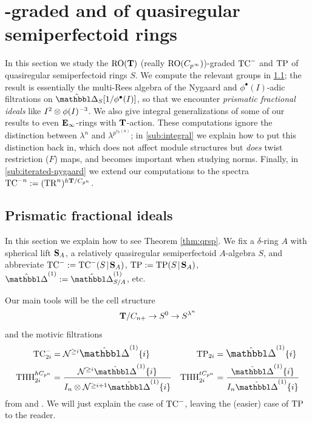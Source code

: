 %
\section{-graded  and  of quasiregular semiperfectoid rings}
\label{sec:qrsp}


\newcommand{\vprism}{\prismcpl^{(1)}}

In this section we study the $\RO(\T)$ (really $\RO(C_{p^\infty})$)-graded $\TCmin$ and $\TP$ of quasiregular semiperfectoid rings $S$. We compute the relevant groups in \sec\ref{sub:qrsp-fractional}; the result is essentially the multi-Rees algebra of the Nygaard and $\phi^\bullet(I)$-adic filtrations on $\prismcpl_S[1/\phi^\bullet(I)]$, so that we encounter \emph{prismatic fractional ideals} like $I^2 \tnsr \phi(I)^{-3}$. We also give integral generalizations of some of our results to even $\E_\infty$-rings with $\T$-action. These computations ignore the distinction between $\lambda^n$ and $\lambda^{p^{v_p(n)}}$; in \sec\ref{sub:integral} we explain how to put this distinction back in, which does not affect module structures but \emph{does} twist restriction ($F$) maps, and becomes important when studying norms. Finally, in \sec\ref{sub:iterated-nygaard} we extend our computations to the spectra $\TC^{-n} \defeq (\TR^n)^{h\T/C_{p^n}}$.

\subsection{Prismatic fractional ideals}
\label{sub:qrsp-fractional}
In this section we explain how to see Theorem \ref{thm:qrsp}. We fix a $\delta$-ring $A$ with spherical lift $\S_A$, a relatively quasiregular semiperfectoid $A$-algebra $S$, and abbreviate $\TCmin\defeq\TCmin(S\rel\S_A)$, $\TP\defeq\TP(S\rel\S_A)$, $\vprism \defeq\vprism_{S/A}$, etc.

Our main tools will be the cell structure
\begin{equation}
  \label{eq:cell}
  \T/C_{n+} \to S^0 \to S^{\lambda^n}
\end{equation}
and the motivic filtrations
\begin{align*}
  \TCmin_{2i} &= \Nyg^{\ge i}\vprism\{i\} & \TP_{2i} &= \vprism\{i\}\\
  \THH^{hC_{p^n}}_{2i} &= \frac{\Nyg^{\ge i}\vprism\{i\}}{I_n\tnsr\Nyg^{\ge i+1}\vprism\{i\}} & \THH^{tC_{p^n}}_{2i} &= \frac{\vprism\{i\}}{I_n\vprism\{i\}}
\end{align*}
from \cite[Theorem 1.12(4)]{BMS2} and \cite[Corollary 3.3]{RiggenbachTruncated}. We will just explain the case of $\TCmin$, leaving the (easier) case of $\TP$ to the reader.

